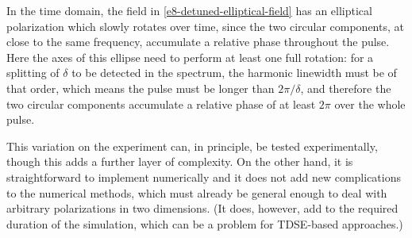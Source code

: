 In the time domain, the field in \eqref{e8-detuned-elliptical-field} has an elliptical polarization which slowly rotates over time, since the two circular components, at close to the same frequency, accumulate a relative phase throughout the pulse. Here the axes of this ellipse need to perform at least one full rotation: for a splitting of $\delta$ to be detected in the spectrum, the harmonic linewidth must be of that order, which means the pulse must be longer than $2\pi/\delta$, and therefore the two circular components accumulate a relative phase of at least $2\pi$ over the whole pulse.

This variation on the experiment can, in principle, be tested experimentally, though this adds a further layer of complexity. On the other hand, it is straightforward to implement numerically and it does not add new complications to the numerical methods, which must already be general enough to deal with arbitrary polarizations in two dimensions. (It does, however, add to the required duration of the simulation, which can be a problem for TDSE-based approaches.)






